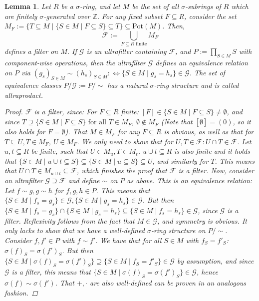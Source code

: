 \documentclass{article}
\def\Z{\mathbb{Z}}
\def\s{\sigma}
\def\fa{\text{ for all }}
\theoremstyle{plain}
\newtheorem{lem}[Satz]{Lemma}
\theoremstyle{definition}
\begin{document}
\begin{lem}\label{lemmafilters}
Let $R$ be a $\s$-ring, and let $M$ be the set of all $\s$-subrings of $R$ which are finitely $\s$-generated over $\Z$. For any fixed subset $F \subseteq R$, consider the set $M_F:= \{ T \subseteq M \mid \{S \in M \mid F \subseteq S \} \subseteq T \} \subseteq \text{Pot}(M)$. 
Then, \[ \mathcal{F}:= \bigcup_{ F \subseteq R \text{ finite} } M_F \]
 defines a filter on $M$. If $\mathcal{G}$ is an ultrafilter containing $\mathcal{F}$, and $P:= \prod_{S \in M} S$ with component-wise operations,
 then the ultrafilter $\mathcal{G}$ defines an equivalence relation on $P$ via $(g_s)_{S \in M} \sim (h_s)_{S \in M} : \Leftrightarrow \{ S \in M \mid g_s = h_s \} \in \mathcal{G}$. 
The set of equivalence classes $P/\mathcal{G}:= P/\sim$ has a natural $\s$-ring structure and is called ultraproduct. %
\begin{proof}
$\mathcal{F}$ is a filter, since: 
  For $F \subseteq R$ finite: $[F] \in \{ S \in M \mid F \subseteq S \} \neq \emptyset$, and since $T \supseteq \{ S \in M \mid F \subseteq S \} \fa T \in M_F$, $\emptyset \notin M_F$ (Note that $[\emptyset] = (0)$, so it also holds for $F = \emptyset$).
  That $M \in M_F$ for any $F \subseteq R$ is obvious, as well as that for $T \subseteq U, T \in M_F$, $U \in M_F$. We only need to show that for $U,T \in \mathcal{F}: U \cap T \in \mathcal{F}$.
  Let $u, t \subseteq R$ be finite, such that $U \in M_u, T \in M_t$. $u \cup t \subseteq R$ is also finite and it holds that  $\{ S \in M \mid u \cup t \subseteq S \} \subseteq \{ S \in M \mid u \subseteq S \} \subseteq U$,
 and similarly for $T$. This means that $U \cap T \in M_{u \cup t} \subseteq \mathcal{F}$, which finishes the proof that $\mathcal{F}$ is a filter.
 Now, consider an ultrafilter $\mathcal{G} \supseteq \mathcal{F}$ and define $\sim$ on $P$ as above. This is an equivalence relation: Let $f \sim g, g \sim h$ for $f,g,h \in P$. 
 This means that $\{ S \in M \mid f_s = g_s \} \in \mathcal{G}, \{ S \in M \mid g_s = h_s \} \in \mathcal{G}$. But then $\{ S \in M \mid f_s = g_s \} \cap \{ S \in M \mid g_s = h_s \} \subseteq \{ S \in M \mid f_s = h_s \} \in \mathcal{G}$, since $\mathcal{G}$ is a filter.
 Reflexivity follows from the fact that $M \in \mathcal{G}$, and symmetry is obvious. It only lacks to show that we have a well-defined $\s$-ring structure on $P/\sim$.
 Consider $f,f' \in P$ with $f \sim f'$. We have that for all $S \in M$ with $f_S = f'_S$:  $\sigma(f)_S = \sigma(f')_S$. 
 But then $\{ S \in M \mid \s(f)_S = \s(f')_S \} \supseteq \{ S \in M \mid f_S = f'_S \} \in \mathcal{G}$ by assumption, and since $\mathcal{G}$ is a filter, this means that $\{ S \in M \mid \s(f)_S = \s(f')_S \} \in \mathcal{G}$,
 hence $\s(f) \sim \s(f')$. That $+, \cdot$ are also well-defined can be proven in an analogous fashion.
\end{proof}
\end{lem}
\end{document}

